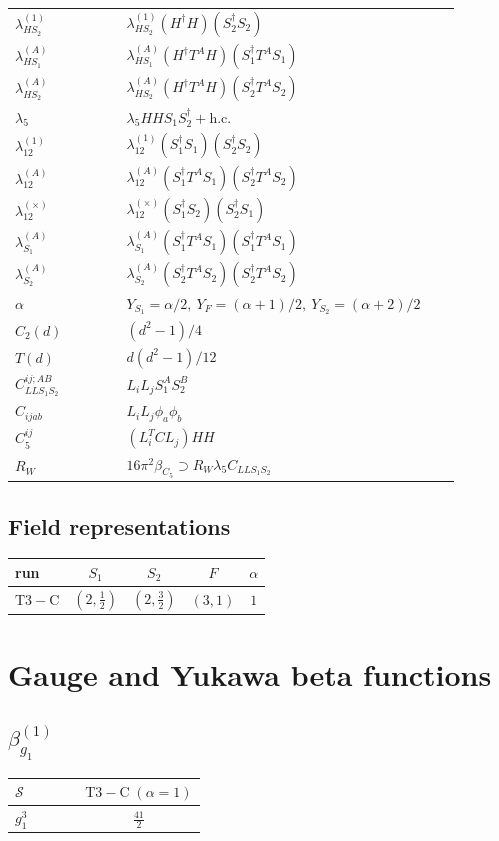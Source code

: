 \documentclass[9pt]{article}
\begin{document}
\begin{longtable}{@{}p{0.23\linewidth}p{0.69\linewidth}@{}}
$\lambda_{HS_2}^{(1)}$ & $\lambda_{HS_2}^{(1)}(H^\dagger H)(S_2^\dagger S_2)$ \\
$\lambda_{HS_1}^{(A)}$ & $\lambda_{HS_1}^{(A)}(H^\dagger T^AH)(S_1^\dagger T^AS_1)$ \\
$\lambda_{HS_2}^{(A)}$ & $\lambda_{HS_2}^{(A)}(H^\dagger T^AH)(S_2^\dagger T^AS_2)$ \\
$\lambda_5$ & $\lambda_5HHS_1S_2^\dagger+\mathrm{h.c.}$ \\
$\lambda_{12}^{(1)}$ & $\lambda_{12}^{(1)}(S_1^\dagger S_1)(S_2^\dagger S_2)$ \\
$\lambda_{12}^{(A)}$ & $\lambda_{12}^{(A)}(S_1^\dagger T^AS_1)(S_2^\dagger T^AS_2)$ \\
$\lambda_{12}^{(\times)}$ & $\lambda_{12}^{(\times)}(S_1^\dagger S_2)(S_2^\dagger S_1)$ \\
$\lambda_{S_1}^{(A)}$ & $\lambda_{S_1}^{(A)}(S_1^\dagger T^A S_1)(S_1^\dagger T^A S_1)$ \\
$\lambda_{S_2}^{(A)}$ & $\lambda_{S_2}^{(A)}(S_2^\dagger T^A S_2)(S_2^\dagger T^A S_2)$ \\
$\alpha$ & $Y_{S_1}=\alpha/2,\ Y_F=(\alpha+1)/2,\ Y_{S_2}=(\alpha+2)/2$ \\
$C_2(d)$ & $(d^2-1)/4$ \\
$T(d)$ & $d(d^2-1)/12$ \\
$C_{LLS_1S_2}^{ij;AB}$ & $L_iL_jS_1^AS_2^B$ \\
$C_{ijab}$ & $L_iL_j\phi_a\phi_b$ \\
$C_5^{ij}$ & $(L_i^TCL_j)HH$ \\
$R_W$ & $16\pi^2\beta_{C_5}\supset R_W\lambda_5C_{LLS_1S_2}$ \\
\bottomrule
\end{longtable}
\subsection*{Field representations}
\begin{longtable}{@{}lcccc@{}}
\toprule
run & $S_1$ & $S_2$ & $F$ & $\alpha$ \\
\midrule
$\mathrm{T3-C}$ & $(2,\frac{1}{2})$ & $(2,\frac{3}{2})$ & $(3,1)$ & $1$ \\
\bottomrule
\end{longtable}
\section*{Gauge and Yukawa beta functions}
\subsection*{$ \beta_{g_1}^{(1)} $}
\begin{longtable}{@{}p{0.38\linewidth}c@{}}
\toprule
$\mathcal{S}$ & $ \mathrm{T3-C}\;(\alpha=1) $ \\
\midrule
$ g_1^3 $ & $ \frac{41}{2} $ \\
\bottomrule
\end{longtable}
\end{document}
